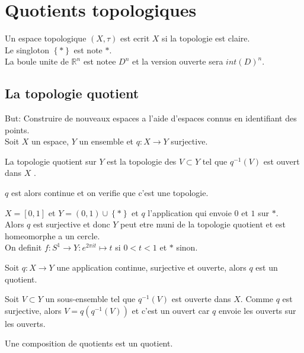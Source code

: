 \message{ !name(lec1.tex)}\documentclass[../main.tex]{subfiles}
\begin{document}

\section{Quotients topologiques}
Un espace topologique $( X,\tau) $ est ecrit $X$ si la topologie est claire.\\
Le singloton $ \left\{ \ast \right\} $ est note $\ast$.\\
La boule unite de $ \mathbb{R}^n$ 	est notee $D^{n}$ et la version ouverte sera $int( D) ^{n}$.\\
\subsection{La topologie quotient}
But: Construire de nouveaux espaces a l'aide d'espaces connus en identifiant des points.\\
Soit $X$ un espace, $Y$ un ensemble et $q:X\to Y$ surjective.
\begin{defn}
	La topologie quotient sur $Y$ est la topologie des $V \subset Y$ tel que $q^{-1}( V) $ est ouvert dans $X$ .
\end{defn}
\begin{rmq}
$q$ est alors continue et on verifie que c'est une topologie.
\end{rmq}
\begin{exemple}
$X= [ 0,1] $ et $Y= ( 0,1) \cup \left\{ \ast \right\} $ et $q$ l'application qui envoie $0$ et $1$ sur $\ast$.\\
Alors $q$ est surjective et donc $Y$ peut etre muni de la topologie quotient et est homeomorphe a un cercle.\\
On definit $f: S^{1}\to Y: e^{2\pi i t} \mapsto t $ si $0<t<1$ et $\ast$ sinon.
\end{exemple}
\begin{propo}
Soit $q:X\to Y$ une application continue, surjective et ouverte, alors $q$ est un quotient.
\end{propo}
\begin{propo}
Soit $V \subset Y$ un sous-ensemble tel que $q^{-1}( V) $ est ouverte dans $X$. Comme $q$ est surjective, alors $V = q( q^{-1}( V) ) $ et c'est un ouvert car $q$ envoie les ouverts sur les ouverts.	
\end{propo}
\begin{propo}
Une composition de quotients est un quotient.
\end{propo}
\end{document}
